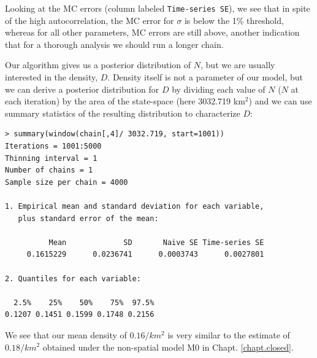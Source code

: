 Looking at the MC errors (column labeled \mbox{\tt Time-series SE}), 
we see that in spite of the high autocorrelation, the MC error for 
$\sigma$ is below the 1\% threshold, whereas for all other parameters, 
MC errors are still above, another indication that for a thorough 
analysis we should run a longer chain.

Our algorithm gives us a posterior distribution of $N$, but we are usually 
interested in the density, $D$. Density itself is not a parameter of our 
model, but we can derive a posterior distribution for $D$ by dividing 
each value of $N$ ($N$ at each iteration) by the area of the state-space
 (here 3032.719 km$^2$) and we can use summary statistics of the 
 resulting distribution to characterize $D$:
\begin{verbatim}
> summary(window(chain[,4]/ 3032.719, start=1001))
Iterations = 1001:5000
Thinning interval = 1
Number of chains = 1
Sample size per chain = 4000

1. Empirical mean and standard deviation for each variable,
   plus standard error of the mean:

          Mean             SD       Naive SE Time-series SE
     0.1615229      0.0236741      0.0003743      0.0027801

2. Quantiles for each variable:

  2.5%    25%    50%    75%  97.5%
0.1207 0.1451 0.1599 0.1748 0.2156
\end{verbatim}
We see that our mean density of $0.16/km^2$ is very similar to the estimate of $0.18/km^2$ obtained under the non-spatial model M0 in Chapt. \ref{chapt.closed}.


